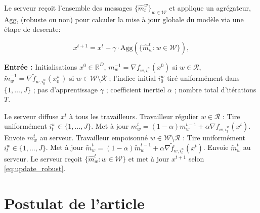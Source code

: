 \documentclass{article}
\begin{document}
Le serveur reçoit l'ensemble des messages $\{\hat{m}_t^{w}\}_{w \in \mathcal{W}}$ et applique un agrégateur, $\mathrm{Agg}$,
(robuste ou non) pour calculer la mise à jour globale du modèle via une étape de descente:


\begin{equation}
    x^{t+1} = x^t - \gamma \cdot \mathrm{Agg}(\{\hat{m}_w^t : w \in \mathcal{W}\}),
    \label{eq:update_robust}
\end{equation}

\begin{algorithm}[h]
\caption{Moment stochastique distribué}
\label{alg:momentum}
\begin{algorithmic}[1]
\State \textbf{Entrée :} Initialisations $x^0 \in \mathbb{R}^D$,
$m_{w}^{-1} = \nabla f_{w,i_0^w}(x^0)$ si $w \in \mathcal{R}$,
$\tilde{m}_{w}^{-1} = \nabla \tilde{f}_{w,i_0^w}(x_0^w)$ si $w \in \mathcal{W} \setminus \mathcal{R}$ ;  
l'indice initial $i_0^w$ tiré uniformément dans $\{1,\dots,J\}$ ;  
pas d’apprentissage $\gamma$ ; coefficient inertiel $\alpha$ ;  
nombre total d’itérations $T$.

    \State Le serveur diffuse $x^t$ à tous les travailleurs.
    \State Travailleur régulier $w \in \mathcal{R}$ :
    \State \hspace{0.8cm} Tire uniformément $i_t^w \in \{1,\dots,J\}$.
    \State \hspace{0.8cm} Met à jour $m_w^t = (1 - \alpha) m_w^{t-1} + \alpha \nabla f_{w,i_t^w}(x^t)$.
    \State \hspace{0.8cm} Envoie $m_w^t$ au serveur.
    \State Travailleur empoisonné $w \in \mathcal{W}\setminus\mathcal{R}$ :
    \State \hspace{0.8cm} Tire uniformément $i_t^w \in \{1,\dots,J\}$.
    \State \hspace{0.8cm} Met à jour $\tilde{m}_w^t = (1 - \alpha)\tilde{m}_w^{t-1} + \alpha \nabla \tilde{f}_{w,i_t^w}(x^t)$.
    \State \hspace{0.8cm} Envoie $\tilde{m}_w^t$ au serveur.
    \State Le serveur reçoit $\{\hat{m}_w^t : w \in \mathcal{W}\}$ et met à jour $x^{t+1}$ selon \eqref{eq:update_robust}.
\EndFor
\end{algorithmic}
\end{algorithm}

\section{Postulat de l'article}
\end{document}
